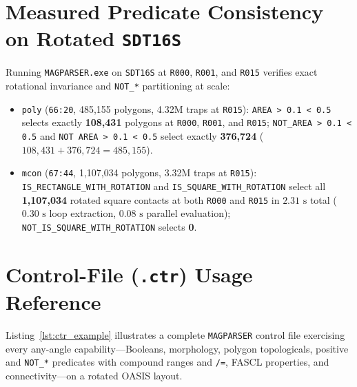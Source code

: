\section{Measured Predicate Consistency on Rotated \texttt{SDT16S}}

Running \texttt{MAGPARSER.exe} on \texttt{SDT16S} at \texttt{R000}, \texttt{R001}, and \texttt{R015} verifies exact rotational invariance and \texttt{NOT\_*} partitioning at scale:
\begin{itemize}
  \item \texttt{poly} (\texttt{66:20}, 485,155 polygons, 4.32M traps at \texttt{R015}): \texttt{AREA > 0.1 < 0.5} selects exactly \textbf{108,431} polygons at \texttt{R000}, \texttt{R001}, and \texttt{R015}; \texttt{NOT\_AREA > 0.1 < 0.5} and \texttt{NOT AREA > 0.1 < 0.5} select exactly \textbf{376,724} ($108{,}431 + 376{,}724 = 485{,}155$).
  \item \texttt{mcon} (\texttt{67:44}, 1,107,034 polygons, 3.32M traps at \texttt{R015}): \texttt{IS\_RECTANGLE\_WITH\_ROTATION} and \texttt{IS\_SQUARE\_WITH\_ROTATION} select all \textbf{1,107,034} rotated square contacts at both \texttt{R000} and \texttt{R015} in $2.31\text{ s}$ total ($0.30\text{ s}$ loop extraction, $0.08\text{ s}$ parallel evaluation); \texttt{NOT\_IS\_SQUARE\_WITH\_ROTATION} selects \textbf{0}.
\end{itemize}

\section{Control-File (\texttt{.ctr}) Usage Reference}

Listing~\ref{lst:ctr_example} illustrates a complete \texttt{MAGPARSER} control file exercising every any-angle capability---Booleans, morphology, polygon topologicals, positive and \texttt{NOT\_*} predicates with compound ranges and \texttt{/=}, FASCL properties, and connectivity---on a rotated OASIS layout.

